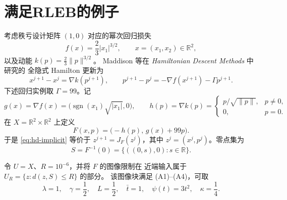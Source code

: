 \section{满足RLEB的例子}
\label{sec:rank-deficient-hamilton}

考虑秩亏设计矩阵 $(1,0)$ 对应的幂次回归损失
\[
 f(x)=\frac23|x_1|^{3/2},\qquad x=(x_1,x_2)\in\mathbb R^2,
\]
以及动能 $k(p)=\frac23\|p\|^{3/2}$。
Maddison 等在 \emph{Hamiltonian Descent Methods} 中研究的
全隐式 Hamilton 更新为
\begin{equation}
\label{eq:hd-implicit}
 x^{j+1}-x^j=\nabla k(p^{j+1}),\qquad
 p^{j+1}-p^j
 =-\nabla f(x^{j+1})-\Gamma p^{j+1}.
\end{equation}
下述回归实例取 $\Gamma=99$。记
\[
 g(x)=\nabla f(x)
   =\bigl(\operatorname{sgn}(x_1)\sqrt{|x_1|},0\bigr),
 \qquad
 h(p)=\nabla k(p)
   =
   \begin{cases}
     p/\sqrt{\|p\|},&p\ne0,\\
     0,&p=0.
   \end{cases}
\]
在 $X=\mathbb R^2\times\mathbb R^2$ 上定义
\[
 F(x,p)=\bigl(-h(p),\,g(x)+99p\bigr).
\]
于是 \eqref{eq:hd-implicit} 等价于
$z^{j+1}=J_F(z^j)$，其中 $z^j=(x^j,p^j)$。零点集为
\[
 S=F^{-1}(0)
   =\{((0,s),0):s\in\mathbb R\}.
\]

\begin{proposition}
\label{prop:rank-deficient-hamilton-rleb}
令 $U=X$、$R=10^{-6}$，并将 $F$ 的图像限制在
近端输入属于
$U_R=\{z:d(z,S)\leq R\}$ 的部分。
该图像块满足 (A1)--(A4)，可取
\[
 \lambda=1,\quad \gamma=\frac12,\quad L=\frac12,\quad
 \bar t=1,\quad \psi(t)=3t^2,\quad \kappa=\frac14.
\]
\end{proposition}

